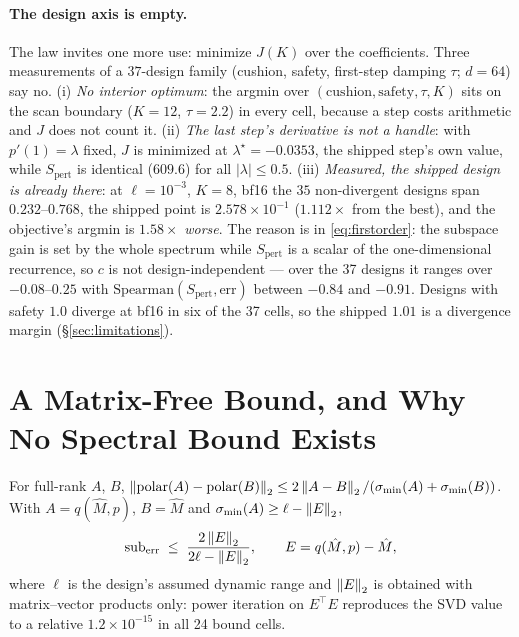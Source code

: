 \paragraph{The design axis is empty.}
\label{sec:design}
The law invites one more use: minimize $J(K)$ over the coefficients.  Three measurements
of a $37$-design family (cushion, safety, first-step damping $\tau$; $d=64$) say no.
(i) \emph{No interior optimum}: the argmin over
$(\text{cushion},\text{safety},\tau,K)$ sits on the scan boundary ($K=12$, $\tau=2.2$)
in every cell, because a step costs arithmetic and $J$ does not count it.  (ii) \emph{The
last step's derivative is not a handle}: with $p'(1)=\lambda$ fixed, $J$ is minimized at
$\lambda^\star=-0.0353$, the shipped step's own value, while $S_{\mathrm{pert}}$ is
identical ($609.6$) for all $|\lambda|\le0.5$.  (iii) \emph{Measured, the shipped design
is already there}: at $\ell=10^{-3}$, $K=8$, bf16 the $35$ non-divergent designs span
$0.232$--$0.768$, the shipped point is $2.578\times10^{-1}$ ($1.112\times$ from the best),
and the objective's argmin is $1.58\times$ \emph{worse}.  The reason is in
\eqref{eq:firstorder}: the subspace gain is set by the whole spectrum while
$S_{\mathrm{pert}}$ is a scalar of the one-dimensional recurrence, so $c$ is not
design-independent --- over the 37 designs it ranges over $-0.08$--$0.25$ with
$\mathrm{Spearman}(S_{\mathrm{pert}},\mathrm{err})$ between $-0.84$ and $-0.91$.  Designs
with safety $1.0$ diverge at bf16 in six of the 37 cells, so the shipped $1.01$ is a
divergence margin (\S\ref{sec:limitations}).

\section{A Matrix-Free Bound, and Why No Spectral Bound Exists}
\label{app:bound}

\begin{proposition}
\label{prop:bound}
For full-rank $A$, $B$,
$\left\lVert \operatorname{polar}(A)-\operatorname{polar}(B) \right\rVert_2 \le 2\left\lVert A-B \right\rVert_2/(\sigma_{\min}(A)+\sigma_{\min}(B))$.
With $A = q(\hat M,p)$, $B = \hat M$ and $\sigma_{\min}(A) \ge \ell - \left\lVert E \right\rVert_2$,
\begin{equation}
\mathrm{sub}_{\mathrm{err}} \;\le\; \frac{2\left\lVert E \right\rVert_2}{2\ell - \left\lVert E \right\rVert_2},
\qquad E = q(\hat M,p) - \hat M ,
\label{eq:bound}
\end{equation}
where $\ell$ is the design's assumed dynamic range and $\left\lVert E \right\rVert_2$ is obtained
with matrix--vector products only: power iteration on $E^\top E$ reproduces the
SVD value to a relative $1.2\times10^{-15}$ in all 24 bound cells.
\end{proposition}

